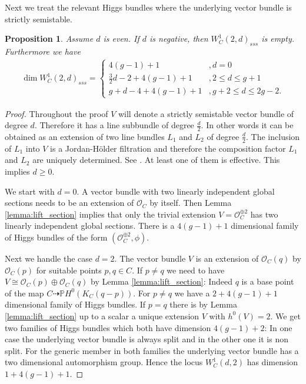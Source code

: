 \documentclass[12pt]{extarticle}
\newtheorem{proposition}[theorem]{Proposition}
\theoremstyle{definition}
\numberwithin{theorem}{section}
\newcommand{\PP}{\mathbb{P}}
\newcommand{\OO}{\mathcal{O}}
\begin{document}
Next we treat the relevant Higgs bundles where the underlying vector bundle is strictly semistable. 
\begin{proposition}
Assume $d$ is even. If $d$ is negative, then $W_C^1(2,d)_{sss} $ is empty. Furthermore we have 
\begin{align*}
\dim W_C^1(2,d)_{sss} = \begin{cases}
4(g-1)+1 &,d = 0\\
\frac{3}{2}d-2 + 4(g-1)+1&,2 \leq d \leq g+1\\
g + d -4 +4(g-1)+1&, g+2 \leq d \leq 2g-2.
\end{cases}
\end{align*}
\end{proposition}
\begin{proof}
Throughout the proof $V$ will denote a strictly semistable vector bundle of degree $d$. Therefore it has a line subbundle of degree $\frac{d}{2}$. In other words it can be obtained as an extension of two line bundles $L_1$ and $L_2$ of degree $\frac{d}{2}$. The inclusion of $L_1$ into $V$ is a Jordan-Hölder filtration and therefore the composition factor $L_1$ and $L_2$ are uniquely determined. See \cite[Proposition 5.3.7]{LePotier}. At least one of them is effective. This implies $d \geq 0$. 

We start with $d = 0$. A vector bundle with two linearly independent global sections needs to be an extension of $\OO_C$ by itself. Then Lemma \ref{lemma:lift_section} implies that only the trivial extension $V = \OO_C^{\oplus 2}$ has two linearly independent global sections. There is a $4(g-1)+1$ dimensional family of Higgs bundles of the form $(\OO_C^{\oplus 2},\phi)$.

Next we handle the case $d = 2$. The vector bundle $V$ is an extension of $\OO_C(q)$ by $\OO_C(p)$ for suitable points $p,q \in C$. If $p \neq q$ we need to have $V \cong \OO_C(p) \oplus \OO_C(q)$ by Lemma \ref{lemma:lift_section}: Indeed $q$ is a base point of the map $C \dashrightarrow \PP H^0(K_C(q-p))$. For $p \neq q$ we have a $2 + 4(g-1) +1$ dimensional family of Higgs bundles. If $p = q$ there is by Lemma \ref{lemma:lift_section} up to a scalar a unique extension $V$ with $h^0(V) = 2$. We get two families of Higgs bundles which both have dimension $4(g-1)+2$: In one case the underlying vector bundle is always split and in the other one it is non split. For the generic member in both families the underlying vector bundle has a two dimensional automorphism group. Hence the locus $W_C^1(d,2)$ has dimension $1+4(g-1)+1$. 


\end{proof}
\end{document}
